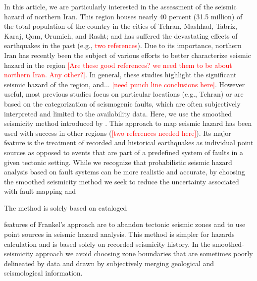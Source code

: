 In this article, we are particularly interested in the assessment of the seismic hazard of northern Iran. This region houses nearly 40 percent (31.5 million) of the total population of the country in the cities of Tehran, Mashhad, Tabriz, Karaj, Qom, Orumieh, and Rasht; and has suffered the devastating effects of earthquakes in the past (e.g., \textcolor{red}{two references}). Due to its importance, northern Iran has recently been the subject of various efforts to better characterize seismic hazard in the region \citep[e.g.,][]{Ghodrati2011, Abdollahzadeh2014a, Boostan2015} \textcolor{red}{[Are these good references? we need them to be about northern Iran. Any other?]}. In general, these studies highlight the significant seismic hazard of the region, and... \textcolor{red}{[need punch line conclusions here]}. However useful, most previous studies focus on particular locations (e.g., Tehran) or are based on the categorization of seismogenic faults, which are often subjectively interpreted and limited to the availability data. Here, we use the smoothed seismicity method introduced by \citep{Frankel1995}. This approach to map seismic hazard has been used with success in other regions (\textcolor{red}{[two references needed here]}). Its major feature is the treatment of recorded and historical earthquakes as individual point sources as opposed to events that are part of a predefined system of faults in a given tectonic setting. While we recognize that probabilistic seismic hazard analysis based on fault systems can be more realistic and accurate, by choosing the smoothed seismicity method we seek to reduce the uncertainty associated with fault mapping and 


The method is solely based on cataloged 

features of Frankel's approach are to abandon tectonic seismic zones and to use point sources in seismic hazard analysis. This method is simpler for hazards calculation and is based solely on recorded seismicity history. In the smoothed-seismicity approach we avoid choosing zone boundaries that are sometimes poorly delineated by data and drawn by subjectively merging geological and seismological information. 



